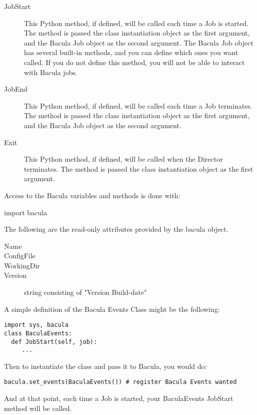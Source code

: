 \begin{description}
\item [JobStart]
   This Python method, if defined, will be called each time a Job is started.
   The method is passed the class instantiation object as the first argument,
   and the Bacula Job object as the second argument.  The Bacula Job object
   has several built-in methods, and you can define which ones you
   want called. If you do not define this method, you will not be able
   to interact with Bacula jobs.

\item [JobEnd]
   This Python method, if defined, will be called each time a Job terminates.
   The method is passed the class instantiation object as the first argument,
   and the Bacula Job object as the second argument.  

\item [Exit]
   This Python method, if defined, will be called when the Director terminates.
   The method is passed the class instantiation object as the first argument.
\end{description}

Access to the Bacula variables and methods is done with:

     import bacula

The following are the read-only attributes provided by the bacula object.
\begin{description}
\item [Name]
\item [ConfigFile]
\item [WorkingDir]
\item [Version] string consisting of "Version  Build-date"
\end{description}


A simple definition of the Bacula Events Class might be the following:

\footnotesize
\begin{verbatim}
import sys, bacula
class BaculaEvents:
  def JobStart(self, job):
     ...
\end{verbatim}
\normalsize

Then to instantiate the class and pass it to Bacula, you
would do:

\footnotesize
\begin{verbatim}
bacula.set_events(BaculaEvents()) # register Bacula Events wanted
\end{verbatim}
\normalsize

And at that point, each time a Job is started, your BaculaEvents JobStart
method will be called.

